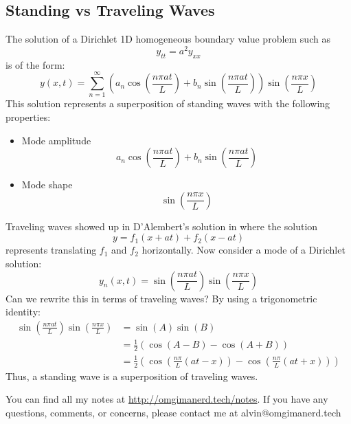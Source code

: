 \documentclass{math}
\begin{document}
\subsection*{Standing vs Traveling Waves}
The solution of a Dirichlet 1D homogeneous boundary value problem such as
\[ y_{tt} = a^2y_{xx} \]
is of the form:
\[ y(x,t) = \sum_{n=1}^{\infty}
  (a_n\cos(\frac{n\pi at}{L})+b_n\sin(\frac{n\pi at}{L}))
  \sin(\frac{n\pi x}{L}) \]
This solution represents a superposition of standing waves with the following
properties:
\begin{itemize}
  \item Mode amplitude
  \[ a_n\cos(\frac{n\pi at}{L})+b_n\sin(\frac{n\pi at}{L}) \]
  \item Mode shape
  \[ \sin(\frac{n\pi x}{L}) \]
\end{itemize}
Traveling waves showed up in D'Alembert's solution in where the solution
\[ y = f_1(x+at)+f_2(x-at) \]
represents translating \( f_1 \) and \( f_2 \) horizontally. Now consider a
mode of a Dirichlet solution:
\[ y_n(x,t) = \sin(\frac{n\pi at}{L})\sin(\frac{n\pi x}{L}) \]
Can we rewrite this in terms of traveling waves? By using a trigonometric
identity:
\begin{align*}
  \sin(\frac{n\pi at}{L})\sin(\frac{n\pi x}{L}) &= \sin(A)\sin(B) \\
  &= \frac{1}{2}(\cos(A-B)-\cos(A+B)) \\
  &= \frac{1}{2}(\cos(\frac{n\pi}{L}(at-x))-\cos(\frac{n\pi}{L}(at+x)))
\end{align*}
Thus, a standing wave is a superposition of traveling waves.

\begin{center}
  You can find all my notes at \url{http://omgimanerd.tech/notes}. If you have
  any questions, comments, or concerns, please contact me at
  alvin@omgimanerd.tech
\end{center}
\end{document}
